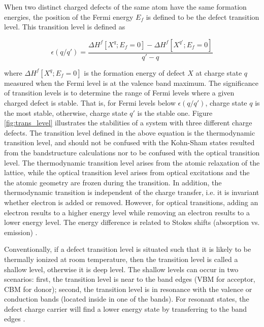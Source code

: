 When two distinct charged defects of the same atom have the same formation energies, the position of the Fermi energy $E_f$ is defined to be  the defect transition level. This transition level is defined as \citep{Janotti2007}

\begin{equation} \label{eq:trans_level}
	\epsilon(q/q')  = \frac{\Delta H^f[X^q;E_f=0] - \Delta H^f[X^{q'};E_f=0]}{q' - q}
\end{equation}

where $\Delta H^f[X^q;E_f=0] $ is the formation energy of defect $X$ at charge state $q$ measured when the Fermi level is at the valence band maximum.  The significance of transition levels is to determine the range of Fermi levels where a given charged defect is stable. That is, for Fermi levels below $\epsilon(q/q')$, charge state $q$ is the most stable, otherwise, charge state $q'$ is the stable one. Figure \ref{fig:trans_level} illustrates the stabilities of a system with three different charge defects. The transition level defined in the above equation is the thermodynamic transition level, and should not be confused with the Kohn-Sham states resulted from the bandstructure calculations nor to be confused with the optical transition level. The thermodynamic transition level arises from the atomic relaxation of the lattice, while the optical transition level arises from optical excitations and the the atomic geometry are frozen during the transition.  In addition, the thermodynamic transition is independent of the charge transfer, i.e. it is invariant whether electron is added or removed. However, for optical transitions, adding an electron results to a higher energy level   while removing  an electron results to a lower energy level. The energy difference is related to Stokes shifts (absorption vs. emission) \citep{Freysoldt2014}.

Conventionally, if a defect transition level is situated such that it is likely to be thermally ionized at room temperature, then the transition level is called a shallow level, otherwise it is deep level. The shallow levels can occur in two scenarios: first, the transition level is near to the band edges (VBM for acceptor, CBM for donor); second, the transition level is in resonance with the valence or conduction bands (located inside in one of the bands).  For resonant states, the defect charge carrier will find a lower energy state by transferring to the band edges \citep{Janotti2007}.


